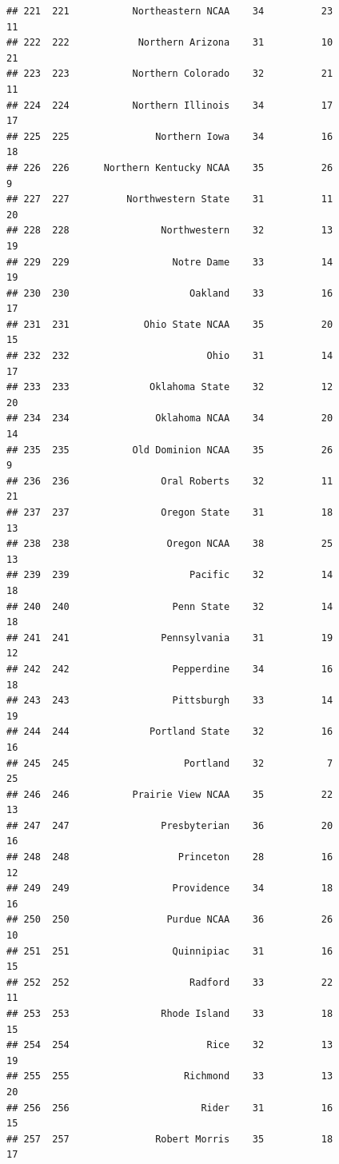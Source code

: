 \documentclass[]{book}
\begin{document}
\begin{verbatim}
## 221  221           Northeastern NCAA    34          23            11
## 222  222            Northern Arizona    31          10            21
## 223  223           Northern Colorado    32          21            11
## 224  224           Northern Illinois    34          17            17
## 225  225               Northern Iowa    34          16            18
## 226  226      Northern Kentucky NCAA    35          26             9
## 227  227          Northwestern State    31          11            20
## 228  228                Northwestern    32          13            19
## 229  229                  Notre Dame    33          14            19
## 230  230                     Oakland    33          16            17
## 231  231             Ohio State NCAA    35          20            15
## 232  232                        Ohio    31          14            17
## 233  233              Oklahoma State    32          12            20
## 234  234               Oklahoma NCAA    34          20            14
## 235  235           Old Dominion NCAA    35          26             9
## 236  236                Oral Roberts    32          11            21
## 237  237                Oregon State    31          18            13
## 238  238                 Oregon NCAA    38          25            13
## 239  239                     Pacific    32          14            18
## 240  240                  Penn State    32          14            18
## 241  241                Pennsylvania    31          19            12
## 242  242                  Pepperdine    34          16            18
## 243  243                  Pittsburgh    33          14            19
## 244  244              Portland State    32          16            16
## 245  245                    Portland    32           7            25
## 246  246           Prairie View NCAA    35          22            13
## 247  247                Presbyterian    36          20            16
## 248  248                   Princeton    28          16            12
## 249  249                  Providence    34          18            16
## 250  250                 Purdue NCAA    36          26            10
## 251  251                  Quinnipiac    31          16            15
## 252  252                     Radford    33          22            11
## 253  253                Rhode Island    33          18            15
## 254  254                        Rice    32          13            19
## 255  255                    Richmond    33          13            20
## 256  256                       Rider    31          16            15
## 257  257               Robert Morris    35          18            17

\end{verbatim}
\end{document}
